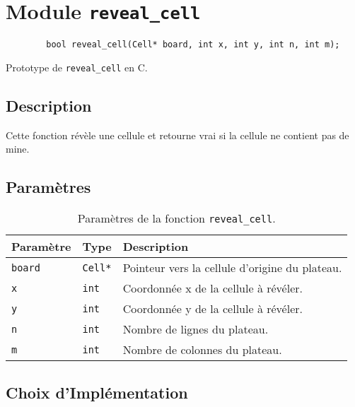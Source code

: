\section{Module \texttt{reveal\_cell}}

\begin{listing}[!htpb]
    \begin{verbatim}
        bool reveal_cell(Cell* board, int x, int y, int n, int m);
    \end{verbatim}
    \caption{Prototype de \texttt{reveal\_cell} en C.}
    \label{listing:c-reveal_cell-prototype}
\end{listing}

\subsection{Description}

Cette fonction révèle une cellule et retourne vrai si la cellule ne contient pas de mine.

\subsection{Paramètres}

\begin{table}[!htpb]
    \label{tab:parameters-reveal_cell}
    \begin{tabularx}{\textwidth}{lXX}
        \toprule
        \textbf{Paramètre} & \textbf{Type} & \textbf{Description} \\
        \midrule
        \texttt{board} & \texttt{Cell*} & Pointeur vers la cellule d'origine du plateau. \\
        \texttt{x} & \texttt{int} & Coordonnée x de la cellule à révéler. \\
        \texttt{y} & \texttt{int} & Coordonnée y de la cellule à révéler. \\
        \texttt{n} & \texttt{int} & Nombre de lignes du plateau. \\
        \texttt{m} & \texttt{int} & Nombre de colonnes du plateau. \\
        \bottomrule
    \end{tabularx}
    \caption{Paramètres de la fonction \texttt{reveal\_cell}.}
\end{table}

\subsection{Choix d'Implémentation}

